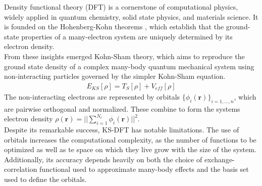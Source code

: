 

Density functional theory (DFT) is a cornerstone of computational physics, widely applied in quantum chemistry, solid state physics, and materials science. It is founded on the Hohenberg-Kohn theorems \cite{hohenberg_inhomogeneous_1964}, which establish that the ground-state properties of a many-electron system are uniquely determined by its electron density.\\
From these insights emerged Kohn-Sham theory\cite{kohn_self-consistent_1965}, which aims to reproduce the ground state density of a complex many-body quantum mechanical system using non-interacting particles governed by the simpler Kohn-Sham equation.
\begin{align}
E_{KS}[\rho ]  = T_S [\rho] + V_{eff}[\rho]
\end{align}
The non-interacting electrons are represented by orbitals $\{\phi_i (\mathbf{r})\}_{i=1,...,n}$, which are pairwise orthogonal and normalized. These combine to form the systems  electron density $\rho(\mathbf{r}) = ||\sum\limits_{i=1}^{N_e} \phi_i(\mathbf{r})||^2$.\\

Despite its remarkable success, KS-DFT has notable limitations. The use of orbitals increases the computational complexity, as the number of functions to be optimized as well as te space on which they live grow with the size of the system. Additionally, its accuracy depends heavily on both the choice of exchange-correlation functional used to approximate many-body effects and the basis set used to define the orbitals.\\


